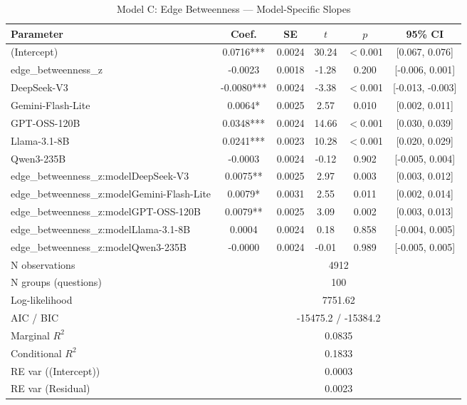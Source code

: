 \begin{table}[htbp]
\centering
\small
\caption{Model C: Edge Betweenness --- Model-Specific Slopes}
\label{tab:lme_model_c_table}
\begin{tabular}{lccccc}
\toprule
Parameter & Coef. & SE & $t$ & $p$ & 95\% CI \\
\midrule
  (Intercept) & 0.0716*** & 0.0024 & 30.24 & $<$0.001 & [0.067, 0.076] \\
  edge\_betweenness\_z & -0.0023 & 0.0018 & -1.28 & 0.200 & [-0.006, 0.001] \\
  DeepSeek-V3 & -0.0080*** & 0.0024 & -3.38 & $<$0.001 & [-0.013, -0.003] \\
  Gemini-Flash-Lite & 0.0064* & 0.0025 & 2.57 & 0.010 & [0.002, 0.011] \\
  GPT-OSS-120B & 0.0348*** & 0.0024 & 14.66 & $<$0.001 & [0.030, 0.039] \\
  Llama-3.1-8B & 0.0241*** & 0.0023 & 10.28 & $<$0.001 & [0.020, 0.029] \\
  Qwen3-235B & -0.0003 & 0.0024 & -0.12 & 0.902 & [-0.005, 0.004] \\
  edge\_betweenness\_z:modelDeepSeek-V3 & 0.0075** & 0.0025 & 2.97 & 0.003 & [0.003, 0.012] \\
  edge\_betweenness\_z:modelGemini-Flash-Lite & 0.0079* & 0.0031 & 2.55 & 0.011 & [0.002, 0.014] \\
  edge\_betweenness\_z:modelGPT-OSS-120B & 0.0079** & 0.0025 & 3.09 & 0.002 & [0.003, 0.013] \\
  edge\_betweenness\_z:modelLlama-3.1-8B & 0.0004 & 0.0024 & 0.18 & 0.858 & [-0.004, 0.005] \\
  edge\_betweenness\_z:modelQwen3-235B & -0.0000 & 0.0024 & -0.01 & 0.989 & [-0.005, 0.005] \\
\midrule
  N observations & \multicolumn{5}{c}{4912} \\
  N groups (questions) & \multicolumn{5}{c}{100} \\
  Log-likelihood & \multicolumn{5}{c}{7751.62} \\
  AIC / BIC & \multicolumn{5}{c}{-15475.2 / -15384.2} \\
  Marginal $R^2$ & \multicolumn{5}{c}{0.0835} \\
  Conditional $R^2$ & \multicolumn{5}{c}{0.1833} \\
  RE var ((Intercept)) & \multicolumn{5}{c}{0.0003} \\
  RE var (Residual) & \multicolumn{5}{c}{0.0023} \\
\bottomrule
\end{tabular}
\end{table}
